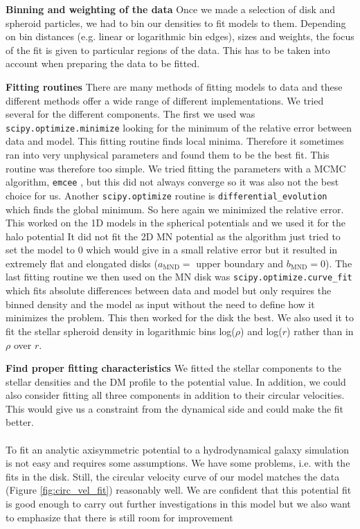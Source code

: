 \textbf{Binning and weighting of the data}
Once we made a selection of disk and spheroid particles, we had to bin our densities to fit models to them. Depending on bin distances (e.g. linear or logarithmic bin edges), sizes and weights, the focus of the fit is given to particular regions of the data. This has to be taken into account when preparing the data to be fitted.

\textbf{Fitting routines}
There are many methods of fitting models to data and these different methods offer a wide range of different implementations. We tried several for the different components. The first we used was \texttt{scipy.optimize.minimize} looking for the minimum of the relative error between data and model. This fitting routine finds local minima. Therefore it sometimes ran into very unphysical parameters and found them to be the best fit. This routine was therefore too simple. We tried fitting the parameters with a MCMC algorithm, \texttt{emcee} \citep{DFM...emcee...2013}, but this did not always converge so it was also not the best choice for us. Another \texttt{scipy.optimize} routine is \texttt{differential\_evolution} which finds the global minimum. So here again we minimized the relative error. This worked on the 1D models in the spherical potentials and we used it for the halo potential It did not fit the 2D \ac{MN} potential as the algorithm just tried to set the model to 0 which would give in a small relative error but it resulted in extremely flat and elongated disks ($a_\mathrm{MND} = $ upper boundary and $b_\mathrm{MND} = 0$). The last fitting routine we then used on the \ac{MN} disk was \texttt{scipy.optimize.curve\_fit} which fits absolute differences between data and model but only requires the binned density and the model as input without the need to define how it minimizes the problem. This then worked for the disk the best. We also used it to fit the stellar spheroid density in logarithmic bins log($\rho$) and log($r$) rather than in $\rho$ over $r$.

\textbf{Find proper fitting characteristics}
We fitted the stellar components to the stellar densities and the \ac{DM} profile to the potential value. In addition, we could also consider fitting all three components in addition to their circular velocities. This would give us a constraint from the dynamical side and could make the fit better.
\\\\
To fit an analytic axisymmetric potential to a hydrodynamical galaxy simulation is not easy and requires some assumptions. We have some problems, i.e. with the fits in the disk. Still, the circular velocity curve of our model matches the data (Figure \ref{fig:circ_vel_fit}) reasonably well. We are confident that this potential fit is good enough to carry out further investigations in this model but we also want to emphasize that there is still room for improvement

